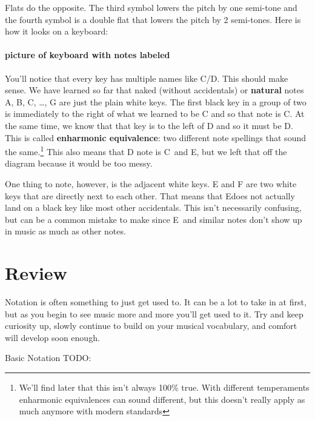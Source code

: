 \documentclass[../OpenAppliedMusicTheory.tex]{subfiles}
\begin{document}
        Flats do the opposite. The third symbol lowers the pitch by one semi-tone and the fourth symbol is a double flat that lowers the pitch by 2 semi-tones. Here is how it looks on a keyboard:

        \paragraph{picture of keyboard with notes labeled}
        You'll notice that every key has multiple names like C\sh/D\fl. This should make sense. We have learned so far that naked (without accidentals) or \textbf{natural} notes A, B, C, \dots, G are just the plain white keys. The first black key in a group of two is immediately to the right of what we learned to be C and so that note is C\sh. At the same time, we know that that key is to the left of D and so it must be D\fl. This is called \textbf{enharmonic equivalence}: two different note spellings that sound the same.\footnote{We'll find later that this isn't always 100\% true. %
        With different temperaments enharmonic equivalences can sound different, but this doesn't really apply as much anymore with modern standards }
        This also means that D note is C\musDoubleSharp\ and E\musDoubleFlat, but we left that off the diagram because it would be too messy.

        One thing to note, however, is the adjacent white keys. E and F are two white keys that are directly next to each other. That means that E\sh does not actually land on a black key like most other accidentals. This isn't necessarily confusing, but can be a common mistake to make since E\sh\ and similar notes don't show up in music as much as other notes.

    \section{Review}

    Notation is often something to just get used to. It can be a lot to take in at first, but as you begin to see music more and more you'll get used to it. Try and keep curiosity up, slowly continue to build on your musical vocabulary, and comfort will develop soon enough.

    \begin{cheatSheet}{Basic Notation}
        TODO:
    \end{cheatSheet}
        
\end{document}
